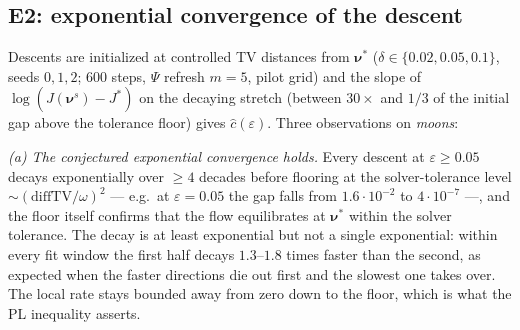 \documentclass[11pt,leqno]{amsart}
\newcommand{\bnu}{\boldsymbol{\nu}}
\newcommand{\eps}{\varepsilon}
\numberwithin{equation}{section}
\theoremstyle{definition}
\begin{document}
\subsection{E2: exponential convergence of the descent}
\label{sec:e2}
Descents are initialized at controlled TV distances from $\bnu^*$
($\delta\in\{0.02,0.05,0.1\}$, seeds $0,1,2$; $600$ steps, $\Psi$ refresh
$m=5$, pilot grid) and the slope of $\log(J(\bnu^s)-J^*)$ on the decaying
stretch (between $30\times$ and $1/3$ of the initial gap above the
tolerance floor) gives $\hat c(\eps)$.  Three observations on \emph{moons}:

\emph{(a) The conjectured exponential convergence holds.}  Every descent at
$\eps\ge0.05$ decays exponentially over $\ge4$ decades before flooring at
the solver-tolerance level $\sim(\mathrm{diffTV}/\omega)^2$ --- e.g.\ at
$\eps=0.05$ the gap falls from $1.6\cdot10^{-2}$ to $4\cdot10^{-7}$ ---, and
the floor itself confirms that the flow equilibrates at $\bnu^*$ within the
solver tolerance.  The decay is at least exponential but not a single
exponential: within every fit window the first half decays $1.3$--$1.8$
times faster than the second, as expected when the faster directions die
out first and the slowest one takes over.  The local rate stays bounded
away from zero down to the floor, which is what the PL inequality
asserts.
\end{document}
